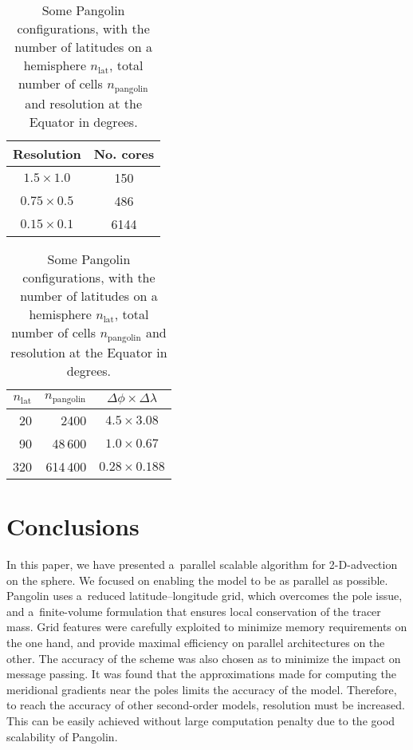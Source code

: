    \begin{table}[t]
     \begin{minipage}[b]{0.45\linewidth}
       \caption{Estimation of the number of cores needed for an efficiency of $0.75$ for
       2-D advection at several resolutions (lat\,$\times$\,long).}
       \centering
       \begin{tabular}{cc}
         \toprule
         Resolution & No. cores \\
         \midrule
         $1.5\times1.0$ & 150  \\
         $0.75\times0.5$ & 486 \\
         $0.15\times0.1$ & 6144 \\
         \bottomrule
       \end{tabular}
       \label{table:nb_cores}
     \end{minipage}
     \hfill
     \begin{minipage}[b]{0.5\linewidth}
       \caption{Some Pangolin configurations, with  the number of latitudes on a
         hemisphere $n_{\text{lat}}$, total number of cells $n_{\text{pangolin}}$ and
       resolution at the Equator in degrees.}
       \centering
       \begin{tabular}{rrc}
         \toprule
         $n_{\text{lat}}$ & $n_{\text{pangolin}}$ & $\Delta\phi \times \Delta\lambda$\\
         \midrule
         20   & 2400   & $4.5  \times 3.08$  \\
         90   & 48\,600  & $1.0  \times 0.67$  \\
         320  & 614\,400 & $0.28 \times 0.188$\\
         \bottomrule
       \end{tabular}
       \label{table:pango_res}
     \end{minipage}
   \end{table}

  \section{Conclusions}
   \label{sec2:ccl}

   In this paper, we have presented a~parallel scalable algorithm for
   2-D-advection on the sphere. We focused on enabling the model to be as
   parallel as possible. Pangolin uses a~reduced latitude--longitude grid, which
   overcomes the pole issue, and a~finite-volume formulation that ensures local
   conservation of the tracer mass.  Grid features were carefully exploited to
   minimize memory requirements on the one hand, and provide maximal efficiency on
   parallel architectures on the other. The accuracy of the scheme was also
   chosen as to minimize the impact on message passing. It was found that the
   approximations made for computing the meridional gradients near the poles
   limits the accuracy of the model. Therefore, to reach the accuracy of other
   second-order models, resolution must be increased. This can be easily
   achieved without large computation penalty due to the good scalability of
   Pangolin.

